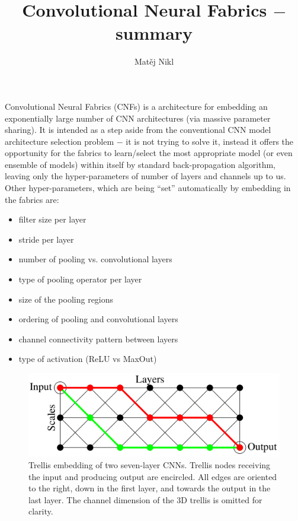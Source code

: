 \documentclass[a4paper,twocolumn]{article}
\title{Convolutional Neural Fabrics $-$ summary}
\author{Matěj Nikl}
\begin{document}
\maketitle
\noindent
Convolutional Neural Fabrics (CNFs) is a architecture for embedding an exponentially large number of CNN architectures (via massive parameter sharing). It is intended as a step aside from the conventional CNN model architecture selection problem $-$  it is not trying to solve it, instead it offers the opportunity for the fabrics to learn/select the most appropriate model (or even ensemble of models) within itself by standard back-propagation algorithm, leaving only the hyper-parameters of number of layers and channels up to us.
Other hyper-parameters, which are being ``set'' automatically by embedding in the fabrics are:
\begin{itemize}
    \item filter size per layer
    \item stride per layer
    \item number of pooling vs. convolutional layers
    \item type of pooling operator per layer
    \item size of the pooling regions
    \item ordering of pooling and convolutional layers
    \item channel connectivity pattern between layers
    \item type of activation (ReLU vs MaxOut)
\end{itemize}


\begin{figure}[!h]
    \includegraphics[width=\columnwidth]{fabrics1.png}
    \caption{Trellis embedding of two seven-layer CNNs. Trellis nodes receiving the input and producing output are encircled. All edges are oriented to the right, down in the first layer, and towards the output in the last layer. The channel dimension of the 3D trellis is omitted for clarity.}
\end{figure}
\end{document}
